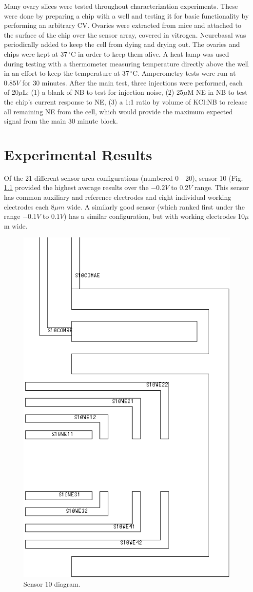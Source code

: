 \documentclass{report}
\begin{document}
Many ovary slices were tested throughout characterization experiments. These were done by preparing a chip with a well and testing it for basic functionality by performing an arbitrary CV. Ovaries were extracted from mice and attached to the surface of the chip over the sensor array, covered in vitrogen. Neurebasal was periodically added to keep the cell from dying and drying out. The ovaries and chips were kept at $37\,^{\circ}\mathrm{C}$ in order to keep them alive. A heat lamp was used during testing with a thermometer measuring temperature directly above the well in an effort to keep the temperature at $37\,^{\circ}\mathrm{C}$. Amperometry tests were run at $0.85V$ for 30 minutes. After the main test, three injections were performed, each of 20$\mu$L: (1) a blank of NB to test for injection noise, (2) 25$\mu$M NE in NB to test the chip's current response to NE, (3) a 1:1 ratio by volume of KCl:NB to release all remaining NE from the cell, which would provide the maximum expected signal from the main 30 minute block.

\chapter{Experimental Results}

Of the 21 different sensor area configurations (numbered 0 - 20), sensor 10 (Fig. \ref{sensor-10} provided the highest average results over the $-0.2V$ to $0.2V$ range. This sensor has common auxiliary and reference electrodes and eight individual working electrodes each $8\mu m$ wide. A similarly good sensor (which ranked first under the range $-0.1V$ to $0.1V$) has a similar configuration, but with working electrodes 10$\mu$m wide.

\begin{figure}
\centering
\includegraphics[height=\linewidth]{figures/s10.png}
\caption{Sensor 10 diagram.}
\label{sensor-10}
\end{figure}
\end{document}

